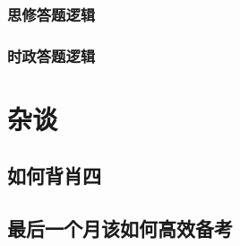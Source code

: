 \documentclass[lang=cn,newtx,10pt,scheme=chinese,pad,twocol]{zznote}
\begin{document}
\subsection{思修答题逻辑}
\subsection{时政答题逻辑}

\chapter{杂谈}
\section{如何背肖四}
\section{最后一个月该如何高效备考}
\end{document}
